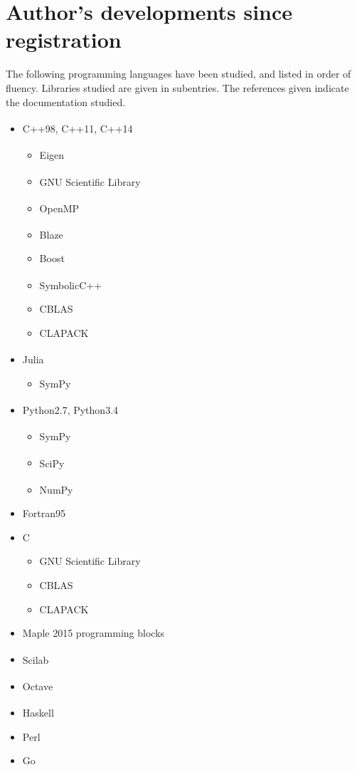 \documentclass[a4paper, 12pt]{article}
\newcommand{\site}[1]{\textsuperscript{\textcolor{blue}{\cite{#1}}}}
\begin{document}
	\section{Author's developments since registration}
	The following programming languages have been studied, and listed in order of fluency. Libraries studied are given in subentries. The references given  indicate the documentation studied.
	\begin{multicols}{2}
	\begin{itemize}
		\item C++98\textsuperscript{\textcolor{blue}{\cite{acc, alex}}}, C++11\site{c++ref}, C++14
			\begin{itemize}
				\item Eigen\site{eigen}
				\item GNU Scientific Library\site{gsl}
				\item OpenMP\site{openmp}
				\item Blaze\site{blaze}
				\item Boost
				\item SymbolicC++\site{symbolicc}
				\item CBLAS
				\item CLAPACK
			\end{itemize}
		\item Julia\site{julia}
			\begin{itemize}
				\item SymPy
			\end{itemize}
		\item Python2.7\site{python}, Python3.4
			\begin{itemize}
				\item SymPy\site{sympy}
				\item SciPy\site{scipy}
				\item NumPy\site{numpy}
			\end{itemize}
			\columnbreak
		\item Fortran95
		\item C
			\begin{itemize}
				\item GNU Scientific Library
				\item CBLAS
				\item CLAPACK
			\end{itemize}
		\item Maple 2015 programming blocks
		\item Scilab\site{scilab}
		\item Octave\site{octave}
		\item Haskell\site{haskell}
		\item Perl
		\item Go
	\end{itemize}
\end{multicols}
\end{document}

